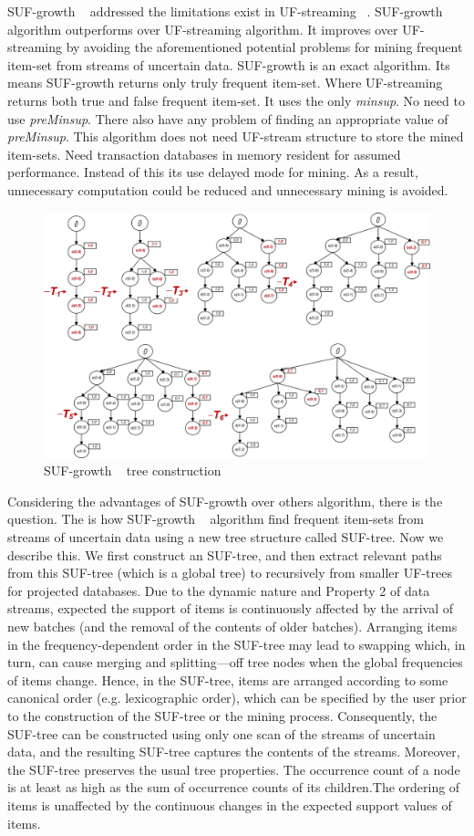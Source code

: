 \documentclass[conference]{IEEEtran}
\begin{document}
SUF-growth ~\cite{suf_growth} addressed the limitations exist in UF-streaming ~\cite{suf_growth}. SUF-growth algorithm outperforms over UF-streaming algorithm. It improves over UF-streaming by avoiding the aforementioned potential problems for mining frequent item-set from streams of uncertain data. SUF-growth is an exact algorithm. Its means SUF-growth returns only truly frequent item-set. Where UF-streaming returns both true and false frequent item-set. It uses the only \emph{minsup}. No need to use \emph{preMinsup}. There also have any problem of finding an appropriate value of \emph{preMinsup}. This algorithm does not need UF-stream structure to store the mined item-sets. Need transaction databases in memory resident for assumed performance. Instead of this its use delayed mode for mining. As a result, unnecessary computation could be reduced and unnecessary mining is avoided.
        \begin{figure}[]
        \centering
            \includegraphics[width=.45\textwidth]{images/suf_simulation}
        \caption{SUF-growth ~\cite{suf_growth} tree construction}
        \label{figure:suf_simulation}
        \end{figure}
Considering the advantages of SUF-growth over others algorithm, there is the question. The is how SUF-growth ~\cite{suf_growth} algorithm find frequent item-sets from streams of uncertain data using a new tree structure called SUF-tree. Now we describe this. We ﬁrst construct an SUF-tree, and then extract relevant paths from this SUF-tree (which is a global tree) to recursively from smaller UF-trees for projected databases. Due to the dynamic nature and Property 2 of data streams, expected the support of items is continuously affected by the arrival of new batches (and the removal of the contents of older batches). Arranging items in the frequency-dependent order in the SUF-tree may lead to swapping which, in turn, can cause merging and splitting—off tree nodes when the global frequencies of items change. Hence, in the SUF-tree, items are arranged according to some canonical order (e.g. lexicographic order), which can be speciﬁed by the user prior to the construction of the SUF-tree or the mining process. Consequently, the SUF-tree can be constructed using only one scan of the streams of uncertain data, and the resulting SUF-tree captures the contents of the streams. Moreover, the SUF-tree preserves the usual tree properties. The occurrence count of a node is at least as high as the sum of occurrence counts of its children.The ordering of items is unaffected by the continuous changes in the expected support values of items.
\end{document}
